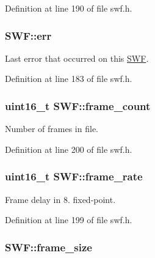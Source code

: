 Definition at line 190 of file swf.\-h.

\hypertarget{struct_s_w_f_afd3f84db8c0aa52bd4923cb23f81ea0b}{
\subsubsection[{err}]{ S\-W\-F\-::err}}\label{struct_s_w_f_afd3f84db8c0aa52bd4923cb23f81ea0b}


Last error that occurred on this \hyperlink{struct_s_w_f}{S\-W\-F}. 



Definition at line 183 of file swf.\-h.

\hypertarget{struct_s_w_f_aad31257e9575ac95fdfdbaaf3505d65b}{
\subsubsection[{frame\-\_\-count}]{\setlength{\rightskip}{0pt plus 5cm}uint16\-\_\-t S\-W\-F\-::frame\-\_\-count}}\label{struct_s_w_f_aad31257e9575ac95fdfdbaaf3505d65b}


Number of frames in file. 



Definition at line 200 of file swf.\-h.

\hypertarget{struct_s_w_f_aa2c564fe1b703896a7970287cc0a131a}{
\subsubsection[{frame\-\_\-rate}]{\setlength{\rightskip}{0pt plus 5cm}uint16\-\_\-t S\-W\-F\-::frame\-\_\-rate}}\label{struct_s_w_f_aa2c564fe1b703896a7970287cc0a131a}


Frame delay in 8. fixed-\/point. 



Definition at line 199 of file swf.\-h.

\hypertarget{struct_s_w_f_afba7a69a7d2cd1fff8fcfd7ed2007c96}{
\subsubsection[{frame\-\_\-size}]{ S\-W\-F\-::frame\-\_\-size}}\label{struct_s_w_f_afba7a69a7d2cd1fff8fcfd7ed2007c96}


